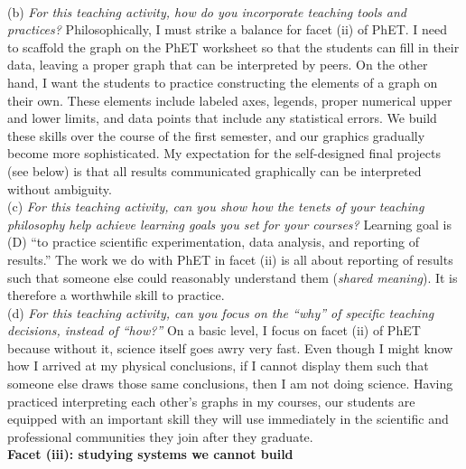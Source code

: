 \documentclass[../../../main.tex]{subfiles}
\begin{document}
\\
\vspace{0.25cm}
(b) \textit{For this teaching activity, how do you incorporate teaching tools and practices?} Philosophically, I must strike a balance for facet (ii) of PhET.  I need to scaffold the graph on the PhET worksheet so that the students can fill in their data, leaving a proper graph that can be interpreted by peers.  On the other hand, I want the students to practice constructing the elements of a graph on their own.  These elements include labeled axes, legends, proper numerical upper and lower limits, and data points that include any statistical errors.  We build these skills over the course of the first semester, and our graphics gradually become more sophisticated.  My expectation for the self-designed final projects (see below) is that all results communicated graphically can be interpreted without ambiguity. 
\\
\vspace{0.25cm}
(c) \textit{For this teaching activity, can you show how the tenets of your teaching philosophy help achieve learning goals you
set for your courses?} Learning goal is (D) ``to practice scientific experimentation, data analysis, and reporting of results.''  The work we do with PhET in facet (ii) is all about reporting of results such that someone else could reasonably understand them (\textit{shared meaning}).  It is therefore a worthwhile skill to practice.
\\
\vspace{0.25cm}
(d) \textit{For this teaching activity, can you focus on the ``why'' of specific teaching decisions, instead of ``how?''}  On a basic level, I focus on facet (ii) of PhET because without it, science itself goes awry very fast.  Even though I might know how I arrived at my physical conclusions, if I cannot display them such that someone else draws those same conclusions, then I am not doing science.  Having practiced interpreting each other's graphs in my courses, our students are equipped with an important skill they will use immediately in the scientific and professional communities they join after they graduate.
\\
\vspace{0.25cm}
\textbf{Facet (iii): studying systems we cannot build}
\\
\vspace{0.25cm}
\end{document}
